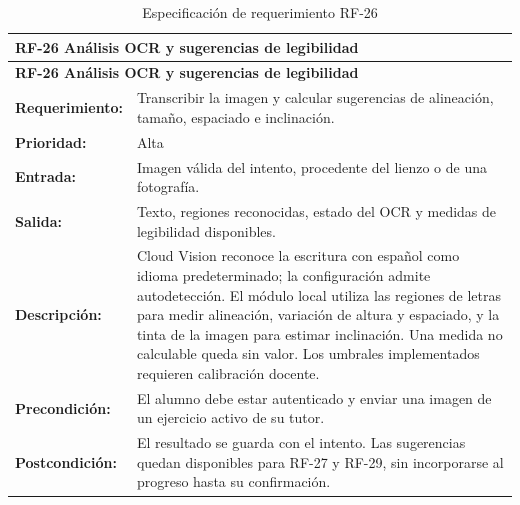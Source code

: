 \begin{longtable}{|p{3.2cm}|p{11.8cm}|}
\caption{Especificación de requerimiento RF-26}\label{tab:rf26} \\ \hline
\multicolumn{2}{|p{15cm}|}{\textbf{RF-26 Análisis OCR y sugerencias de legibilidad}} \\ \hline
\endfirsthead
\hline
\multicolumn{2}{|p{15cm}|}{\textbf{RF-26 Análisis OCR y sugerencias de legibilidad}} \\ \hline
\endhead
\textbf{Requerimiento:} & Transcribir la imagen y calcular sugerencias de alineación, tamaño, espaciado e inclinación. \\ \hline
\textbf{Prioridad:} & Alta \\ \hline
\textbf{Entrada:} & Imagen válida del intento, procedente del lienzo o de una fotografía. \\ \hline
\textbf{Salida:} & Texto, regiones reconocidas, estado del OCR y medidas de legibilidad disponibles. \\ \hline
\textbf{Descripción:} & Cloud Vision reconoce la escritura con español como idioma predeterminado; la configuración admite autodetección. El módulo local utiliza las regiones de letras para medir alineación, variación de altura y espaciado, y la tinta de la imagen para estimar inclinación. Una medida no calculable queda sin valor. Los umbrales implementados requieren calibración docente. \\ \hline
\textbf{Precondición:} & El alumno debe estar autenticado y enviar una imagen de un ejercicio activo de su tutor. \\ \hline
\textbf{Postcondición:} & El resultado se guarda con el intento. Las sugerencias quedan disponibles para RF-27 y RF-29, sin incorporarse al progreso hasta su confirmación. \\ \hline
\end{longtable}


